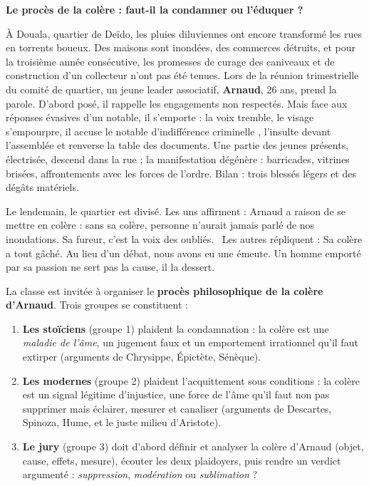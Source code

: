 \documentclass[11pt]{article}
\newcounter{popsec}
\newcounter{popsub}
\newcommand{\courssub}[1]{%
  \stepcounter{popsub}%
  \par\vspace{9pt}\noindent{\popxbold\fontsize{11.5}{13}\selectfont\color{popink}{\color{poporange}\thepopsec.\thepopsub}\hspace{6pt}#1}\par\nopagebreak\vspace{4pt}
}
\begin{document}
\courssub{Situation}

\textbf{Le procès de la colère : faut-il la condamner ou l'éduquer ?}

\medskip

À Douala, quartier de Deïdo, les pluies diluviennes ont encore transformé les rues en torrents boueux. Des maisons sont inondées, des commerces détruits, et pour la troisième année consécutive, les promesses de curage des caniveaux et de construction d'un collecteur n'ont pas été tenues. Lors de la réunion trimestrielle du comité de quartier, un jeune leader associatif, \textbf{Arnaud}, 26 ans, prend la parole. D'abord posé, il rappelle les engagements non respectés. Mais face aux réponses évasives d'un notable, il s'emporte : la voix tremble, le visage s'empourpre, il accuse le notable d'\guillemotleft indifférence criminelle \guillemotright, l'insulte devant l'assemblée et renverse la table des documents. Une partie des jeunes présents, électrisée, descend dans la rue ; la manifestation dégénère : barricades, vitrines brisées, affrontements avec les forces de l'ordre. Bilan : trois blessés légers et des dégâts matériels.

\medskip

Le lendemain, le quartier est divisé. Les uns affirment : \guillemotleft Arnaud a raison de se mettre en colère : sans sa colère, personne n'aurait jamais parlé de nos inondations. Sa fureur, c'est la voix des oubliés. \guillemotright\ Les autres répliquent : \guillemotleft Sa colère a tout gâché. Au lieu d'un débat, nous avons eu une émeute. Un homme emporté par sa passion ne sert pas la cause, il la dessert. \guillemotright

\medskip

La classe est invitée à organiser le \textbf{procès philosophique de la colère d'Arnaud}. Trois groupes se constituent :

\begin{enumerate}
\item \textbf{Les stoïciens} (groupe 1) plaident la condamnation : la colère est une \emph{maladie de l'âme}, un jugement faux et un emportement irrationnel qu'il faut extirper (arguments de Chrysippe, Épictète, Sénèque).
\item \textbf{Les modernes} (groupe 2) plaident l'acquittement sous conditions : la colère est un signal légitime d'injustice, une force de l'âme qu'il faut non pas supprimer mais éclairer, mesurer et canaliser (arguments de Descartes, Spinoza, Hume, et le juste milieu d'Aristote).
\item \textbf{Le jury} (groupe 3) doit d'abord définir et analyser la colère d'Arnaud (objet, cause, effets, mesure), écouter les deux plaidoyers, puis rendre un verdict argumenté : \emph{suppression}, \emph{modération} ou \emph{sublimation} ?
\end{enumerate}
\end{document}
